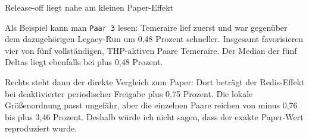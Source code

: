 \documentclass[aspectratio=169,10pt]{beamer}
\newcommand{\smallcode}[1]{\texttt{\footnotesize #1}}
\begin{document}
\begin{frame}{Release-off liegt nahe am kleinen Paper-Effekt}
{  \par\medskip
  Als Beispiel kann man \smallcode{Paar 3} lesen: Temeraire lief zuerst und war gegenüber dem dazugehörigen Legacy-Run um 0,48 Prozent schneller. Insgesamt favorisieren vier von fünf vollständigen, THP-aktiven Paare Temeraire. Der Median der fünf Deltas liegt ebenfalls bei plus 0,48 Prozent.
  
  \par\medskip
  Rechts steht dann der direkte Vergleich zum Paper: Dort beträgt der Redis-Effekt bei deaktivierter periodischer Freigabe plus 0,75 Prozent. Die lokale Größenordnung passt ungefähr, aber die einzelnen Paare reichen von minus 0,76 bis plus 3,46 Prozent. Deshalb würde ich nicht sagen, dass der exakte Paper-Wert reproduziert wurde.
}
\end{frame}
\end{document}
